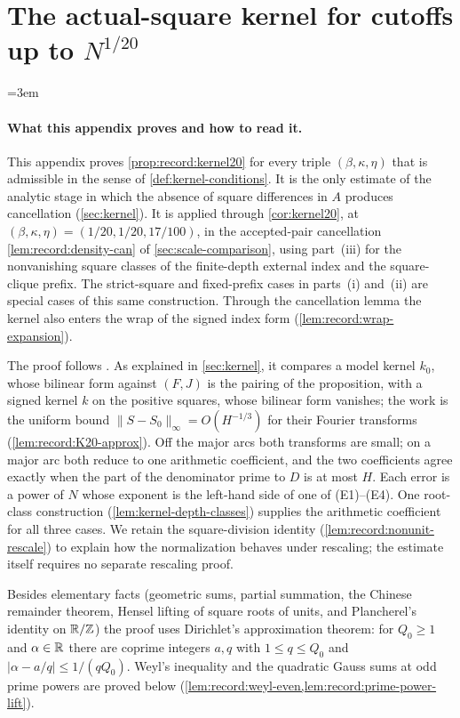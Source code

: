 \section{The actual-square kernel for cutoffs up to \texorpdfstring{$N^{1/20}$}{N to the 1/20}}
\label{app:kernel20}

\begingroup
\emergencystretch=3em

\paragraph{What this appendix proves and how to read it.}
This appendix proves \cref{prop:record:kernel20} for every triple
$(\beta,\kappa,\eta)$ that is admissible in the sense of
\cref{def:kernel-conditions}. It is the only estimate of the analytic stage in
which the absence of square differences in $A$ produces cancellation
(\cref{sec:kernel}). It is
applied through \cref{cor:kernel20}, at
$(\beta,\kappa,\eta)=(1/20,1/20,17/100)$, in the accepted-pair cancellation
\cref{lem:record:density-can} of \cref{sec:scale-comparison}, using part~(iii)
for the nonvanishing square classes of the finite-depth external index
and the square-clique prefix. The strict-square and fixed-prefix cases
in parts~(i) and~(ii) are special cases of this same construction. Through
the cancellation lemma the kernel also enters the wrap of the signed index
form (\cref{lem:record:wrap-expansion}).

The proof follows \cite[Prop.~6.1]{OpenAI}. As explained in
\cref{sec:kernel}, it compares a model kernel $k_0$, whose bilinear form
against $(F,J)$ is the pairing of the proposition, with a signed kernel $k$ on
the positive squares, whose bilinear form vanishes; the work is the uniform
bound $\|S-S_0\|_\infty=O(H^{-1/3})$ for their Fourier transforms
(\cref{lem:record:K20-approx}). Off the major arcs both transforms are small;
on a major arc both reduce to one arithmetic coefficient, and the two
coefficients agree exactly when the part of the denominator prime to $D$ is at
most $H$. Each error is a power of $N$ whose exponent is the left-hand side of
one of (E1)--(E4). One root-class construction
(\cref{lem:kernel-depth-classes}) supplies the arithmetic coefficient for
all three cases. We retain the square-division identity
(\cref{lem:record:nonunit-rescale}) to explain how the normalization behaves
under rescaling; the estimate itself requires no separate rescaling proof.

Besides elementary facts (geometric sums, partial summation, the Chinese
remainder theorem, Hensel lifting of square roots of units, and Plancherel's
identity on $\mathbb R/\mathbb Z$) the proof uses Dirichlet's approximation theorem: for
$Q_0\ge1$ and $\alpha\in\mathbb R$ there are coprime integers $a,q$ with
$1\le q\le Q_0$ and $|\alpha-a/q|\le1/(qQ_0)$. Weyl's inequality and the
quadratic Gauss sums at odd prime powers are proved below
(\cref{lem:record:weyl-even,lem:record:prime-power-lift}).

